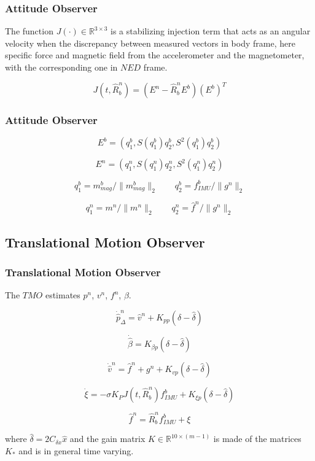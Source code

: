 \documentclass{beamer}
\begin{document}
	\begin{frame}
 		\frametitle{Attitude Observer}
 		The function $J(\cdot) \in  \mathds{R}^{3\times 3}$ is a stabilizing injection term that acts as an angular velocity when the discrepancy between measured vectors in body frame, here specific force and magnetic field from the accelerometer and the magnetometer, with the corresponding one in $NED$ frame.
 		
 		\[ J(t, \hat{R}^n_b)  = (E^n - \hat{R}^n_b E^b)(E^b)^T   \]

 		

	\end{frame}

	\begin{frame}
		\frametitle{Attitude Observer}
		
		\[ E^b = (q_1^b, S(q^b_1)q_2^b, S^2(q_1^b)q_2^b)    \]
		
		\[ E^n = (q_1^n, S(q^n_1)q_2^n, S^2(q_1^n)q_2^n)    \]
		
		
		\[ q_1^b = m^b_{mag}/\|m^b_{mag}\|_2 \qquad q_2^b = f^b_{IMU}/\|g^n\|_2    \]
		
		\[ q_1^n = m^n/\|m^n\|_2 \qquad q_2^n = \hat{f}^n/\|g^n\|_2    \]
		
	\end{frame}
\subsection{Translational Motion Observer}

	\begin{frame}
		\frametitle{Translational Motion Observer}
		The $TMO$ estimates $p^n$, $v^n$, $f^n$, $\beta$.
		
		\[ \dot{\hat{p}}^n_\Delta = \hat{v}^n + K_{pp}(\delta - \hat{\delta})  \]
		
		\[ \dot{\hat{\beta}} = K_{\beta p} (\delta - \hat{\delta}) \]
		
		\[ \dot{\hat{v}}^n = \hat{f}^n + g^n + K_{vp}(\delta - \hat{\delta})\]
		
		\[ \dot{\xi} = - \sigma K_P J(t, \hat{R}^n_b)f^b_{IMU} + K_{\xi p}(\delta - \hat{\delta}) \]
		
		\[ \hat{f}^n = \hat{R}^n_b f^b_{IMU} + \xi  \]
		
		where $\hat{\delta} = 2C_{\delta x}\hat{x}$ and the gain matrix $K \in \mathds{R}^{10\times(m-1)}$ is made of the matrices $K_*$ and is in general time varying.
	\end{frame}
\end{document}
